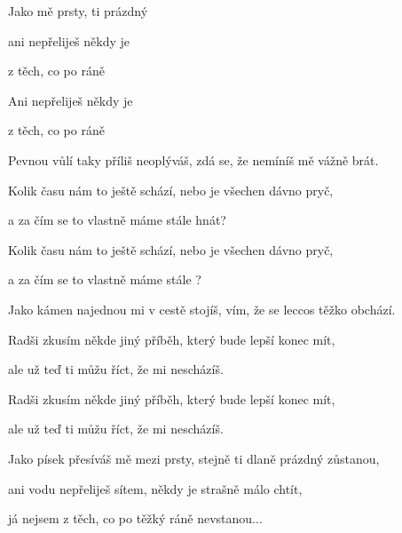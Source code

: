 

\zs
Jako   mě  prsty,
 ti  prázdný  

ani  nepřeliješ 
někdy je   

 z těch, co po  ráně

Ani  nepřeliješ 
někdy je    

 z těch, co po  ráně
 \ks

\zs
Pevnou vůlí taky příliš neoplýváš, zdá se, že nemíníš mě vážně brát. 

Kolik času nám to ještě schází, nebo je všechen dávno pryč, 

a za čím se to vlastně máme stále hnát? 

Kolik času nám to ještě schází, nebo je všechen dávno pryč, 

a za čím se to vlastně máme stále ? 
\ks

\zs
Jako kámen najednou mi v cestě stojíš, vím, že se leccos těžko obchází. 

Radši zkusím někde jiný příběh, který bude lepší konec mít, 

ale už teď ti můžu říct, že mi nescházíš. 

Radši zkusím někde jiný příběh, který bude lepší konec mít, 

ale už teď ti můžu říct, že mi nescházíš. 
\ks

\zs
Jako písek přesíváš mě mezi prsty, stejně ti dlaně prázdný zůstanou, 

ani vodu nepřeliješ sítem, někdy je strašně málo chtít, 

já nejsem z těch, co po těžký ráně nevstanou...
\ks

\kp

